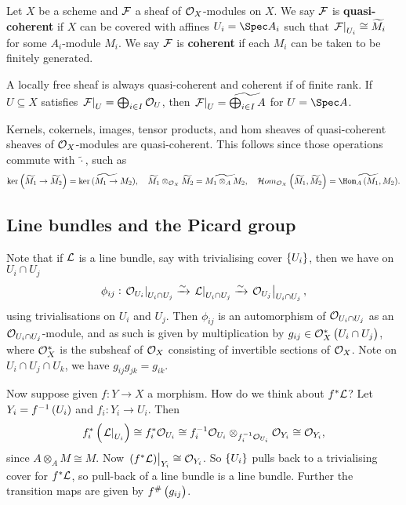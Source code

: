 \begin{definition*}
Let $ X $ be a scheme and $ \mathcal{F} $ a sheaf of $ \mathcal{O}_X $-modules on $ X $. We say $ \mathcal{F} $ is \textbf{quasi-coherent} if $ X $ can be covered with affines $ U_i = \Spec A_i $ such that $ \left. \mathcal{F} \right|_{U_i} \cong \widetilde{M_i} $ for some $ A_i $-module $ M_i $. We say $ \mathcal{F} $ is \textbf{coherent} if each $ M_i $ can be taken to be finitely generated.
\end{definition*}

\begin{example*}
A locally free sheaf is always quasi-coherent and coherent if of finite rank. If $ U \subseteq X $ satisfies $ \left. \mathcal{F} \right|_U = \bigoplus_{i \in I} \mathcal{O}_U $, then $ \left. \mathcal{F} \right|_U = \widetilde{\bigoplus_{i \in I} A} $ for $ U = \Spec A $.
\end{example*}

Kernels, cokernels, images, tensor products, and hom sheaves of quasi-coherent sheaves of $ \mathcal{O}_X $-modules are quasi-coherent. This follows since those operations commute with $ \widetilde{\cdot} $, such as
$$ \ker \br{\widetilde{M_1} \to \widetilde{M_2}} = \widetilde{\ker \br{M_1 \to M_2}}, \quad \widetilde{M_1} \otimes_{\OOO_X} \widetilde{M_2} = \widetilde{M_1 \otimes_A M_2}, \quad \HOM_{\OOO_X}\br{\widetilde{M_1}, \widetilde{M_2}} = \widetilde{\Hom_A\br{M_1, M_2}}. $$

\pagebreak

\subsection{Line bundles and the Picard group}

\begin{remark*}
Note that if $ \mathcal{L} $ is a line bundle, say with trivialising cover $ \cbr{U_i} $, then we have on $ U_i \cap U_j $
$$ \phi_{ij} : \left. \mathcal{O}_{U_i} \right|_{U_i \cap U_j} \xrightarrow{\sim} \left. \mathcal{L} \right|_{U_i \cap U_j} \xrightarrow{\sim} \left. \mathcal{O}_{U_j} \right|_{U_i \cap U_j}, $$
using trivialisations on $ U_i $ and $ U_j $. Then $ \phi_{ij} $ is an automorphism of $ \mathcal{O}_{U_i \cap U_j} $ as an $ \mathcal{O}_{U_i \cap U_j} $-module, and as such is given by multiplication by $ g_{ij} \in \OOO_X^*\br{U_i \cap U_j} $, where $ \mathcal{O}_X^* $ is the subsheaf of $ \mathcal{O}_X $ consisting of invertible sections of $ \mathcal{O}_X $. Note on $ U_i \cap U_j \cap U_k $, we have $ g_{ij}g_{jk} = g_{ik} $.
\end{remark*}

Now suppose given $ f : Y \to X $ a morphism. How do we think about $ f^*\mathcal{L} $? Let $ Y_i = f^{-1}\br{U_i} $ and $ f_i : Y_i \to U_i $. Then
$$ f_i^*\br{\eval{\LLL}_{U_i}} \cong f_i^*\OOO_{U_i} \cong f_i^{-1}\OOO_{U_i} \otimes_{f_i^{-1}\OOO_{U_i}} \OOO_{Y_i} \cong \OOO_{Y_i}, $$
since $ A \otimes_A M \cong M $. Now $ \eval{\br{f^*\LLL}}_{Y_i} \cong \OOO_{Y_i} $. So $ \cbr{U_i} $ pulls back to a trivialising cover for $ f^*\mathcal{L} $, so pull-back of a line bundle is a line bundle. Further the transition maps are given by $ f^\#\br{g_{ij}} $.

